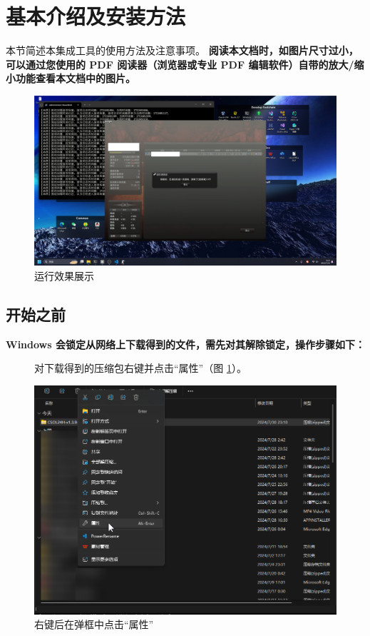\section{基本介绍及安装方法}

本节简述本集成工具的使用方法及注意事项。\textbf{\color{red} 阅读本文档时，如图片尺寸过小，可以通过您使用的 PDF 阅读器（浏览器或专业 PDF 编辑软件）自带的放大/缩小功能查看本文档中的图片。}

\begin{figure}[H]
    \Centering
    \includegraphics[width=\textwidth]{docs/assets/intro/controller.png}
    \caption{运行效果展示}
\end{figure}

\subsection{开始之前}

\textbf{\color{red}Windows 会锁定从网络上下载得到的文件，需先对其解除锁定，操作步骤如下：}

\begin{figure}[H]
    \Centering
    \parbox[l]{\textwidth}{对下载得到的压缩包右键并点击“属性”（图 \ref{ch0fig-unlock-0}）。}
    \includegraphics[width=\textwidth]{docs/assets/intro/unlock_00.png}
    \caption{右键后在弹框中点击“属性”}
    \label{ch0fig-unlock-0}
\end{figure}

